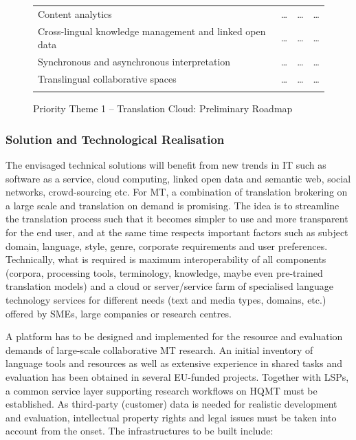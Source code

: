 \documentclass[10pt, plain]{../../metanetpaper}
\begin{document}
\begin{multicols}{2}
\begin{figure}[htbp]
\begin{tabular}{@{}p{2.5cm}p{4cm}p{4cm}p{4cm}@{}}
Content analytics & \dots & \dots & \dots \\ \addlinespace
Cross-lingual knowledge management and linked open data & \dots & \dots & \dots \\ \addlinespace
Synchronous and asynchronous interpretation & \dots & \dots & \dots \\ \addlinespace
Translingual collaborative spaces & \dots & \dots & \dots \\ \addlinespace\bottomrule
  \end{tabular}
  \caption{Priority Theme 1 -- Translation Cloud: Preliminary Roadmap}
  \label{fig:pt1-roadmap}
\end{figure}

\subsubsection{Solution and Technological Realisation}
\label{sec:solut-techn-real-pt1}

The envisaged technical solutions will benefit from new trends in IT such as software as a service, cloud  computing, linked open data and semantic web, social networks, crowd-sourcing etc. For MT, a combination of translation brokering on a large scale and translation on demand is promising. The idea is to streamline the translation process such that it becomes simpler to use and more transparent for the end user, and at the same time respects important factors such as subject domain, language, style, genre, corporate requirements and user preferences. Technically, what is required is maximum interoperability of all components (corpora, processing tools, terminology, knowledge, maybe even pre-trained translation models) and a cloud or server/service farm of specialised language technology services for different needs (text and media types, domains, etc.) offered by SMEs, large companies or research centres.
 
A platform has to be designed and implemented for the resource and evaluation demands of large-scale collaborative MT research. An initial inventory of language tools and resources as well as extensive experience in shared tasks and evaluation has been obtained in several EU-funded projects.
Together with LSPs, a common service layer supporting research workflows on HQMT must be established. As third-party (customer) data is needed for realistic development and evaluation, intellectual property rights and legal issues must be taken into account from the onset. The infrastructures to be built include:


\end{multicols}
\end{document}
